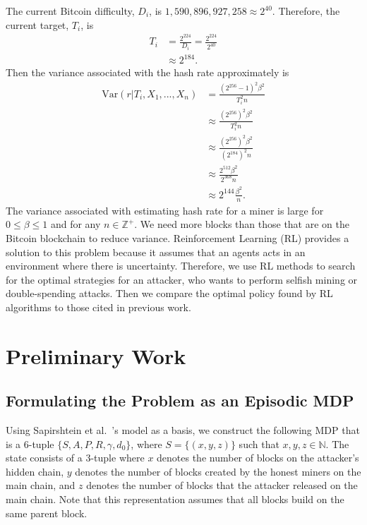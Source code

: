 The current Bitcoin difficulty, $D_i$, is $1,590,896,927,258 \approx 2^{40}$. Therefore, the current target, $T_i$, is
\begin{align}
T_i &= \frac{2^{224}}{D_i} = \frac{2^{224}}{2^{40}} \\
&\approx 2^{184}.
\end{align}
Then the variance associated with the hash rate approximately is
\begin{align}
\text{Var}(r|T_i,X_1,...,X_n) &= \frac{(2^{256}-1)^2\beta^2}{T_i^2n} \\
&\approx  \frac{(2^{256})^2\beta^2}{T_i^2n} \\
&\approx  \frac{(2^{256})^2\beta^2}{(2^{184})^2n} \\
&\approx  \frac{2^{512}\beta^2}{2^{368}n} \\
&\approx  2^{144}\frac{\beta^2}{n}.
\end{align}
The variance associated with estimating hash rate for a miner is large for $0 \leq \beta \leq 1$ and for any $n \in \mathbb{Z}^+ $. We need more blocks than those that are on the Bitcoin blockchain to reduce variance. Reinforcement Learning (RL) provides a solution to this problem because it assumes that an agents acts in an environment where there is uncertainty. Therefore, we use RL methods to search for the optimal strategies for an attacker, who wants to perform selfish mining or double-spending attacks. Then we compare the optimal policy found by RL algorithms to those cited in previous work.

\section{Preliminary Work}
\subsection{Formulating the Problem as an Episodic MDP}
 Using Sapirshtein et al.~\cite{sapirshtein:2015}'s model as a basis, we construct the following MDP that is a 6-tuple $\{S, A, P, R, \gamma, d_0\}$, where $S = \{(x, y, z)\}$ such that $x, y, z \in \mathbb{N}$. The state consists of a 3-tuple where $x$ denotes the number of blocks on the attacker's hidden chain, $y$ denotes the number of blocks created by the honest miners on the main chain, and $z$ denotes the number of blocks that the attacker released on the main chain. Note that this representation assumes that all blocks build on the same parent block. 

